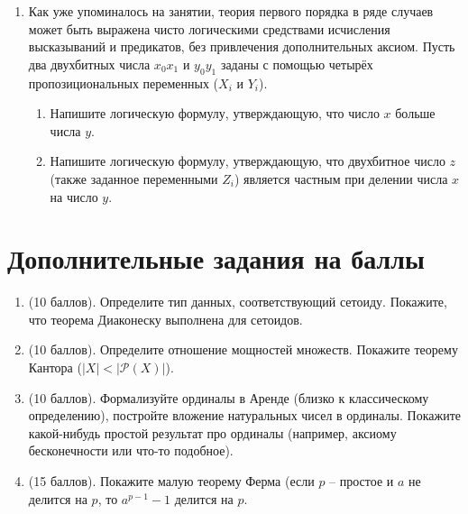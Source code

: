 \documentclass[10pt,a4paper,oneside]{article}
\begin{document}
\begin{enumerate}
\item Как уже упоминалось на занятии, теория первого порядка в ряде случаев может быть выражена чисто логическими
средствами исчисления высказываний и предикатов, без привлечения дополнительных аксиом.
Пусть два двухбитных числа $x_0x_1$ и $y_0y_1$ заданы с помощью четырёх пропозициональных переменных ($X_i$ и $Y_i$). 
\begin{enumerate}
\item Напишите логическую формулу, утверждающую, что число $x$ больше числа $y$.
\item Напишите логическую формулу, утверждающую, что двухбитное число $z$ (также заданное переменными $Z_i$) является частным при делении 
числа $x$ на число $y$. 
\end{enumerate}
\end{enumerate}

\section*{Дополнительные задания на баллы}

\begin{enumerate}
\item (10 баллов). Определите тип данных, соответствующий сетоиду. Покажите, что теорема Диаконеску выполнена для сетоидов.
\item (10 баллов). Определите отношение мощностей множеств. Покажите теорему Кантора ($|X| < |\mathcal{P}(X)|$). 
\item (10 баллов). Формализуйте ординалы в Аренде (близко к классическому определению), постройте вложение натуральных чисел в ординалы.
Покажите какой-нибудь простой результат про ординалы (например, аксиому бесконечности или что-то подобное).
\item (15 баллов). Покажите малую теорему Ферма (если $p$ -- простое и $a$ не делится на $p$, то $a^{p-1}-1$ делится на $p$.
\end{enumerate}
\end{document}

